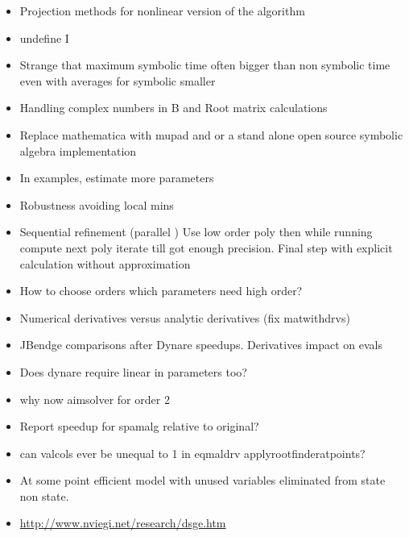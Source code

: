\documentclass[12pt]{article}
\begin{document}
\begin{itemize}
\item Projection methods for nonlinear version of the algorithm
\item undefine I
\item Strange that maximum symbolic time often bigger than non symbolic time even with averages for symbolic smaller
\item Handling complex numbers in B and Root matrix calculations
\item Replace mathematica with mupad and or a stand alone open source symbolic algebra implementation
\item In examples, estimate more parameters
\item Robustness avoiding local mins
\item Sequential refinement (parallel )  Use low order poly then while running compute next poly iterate till got enough precision. Final step with explicit calculation without approximation
\item How to choose orders which parameters need high order?
\item Numerical derivatives versus analytic derivatives (fix matwithdrvs)
\item JBendge comparisons after Dynare speedups. Derivatives impact on evals
\item Does dynare require linear in parameters too?
\item why now aimsolver for order 2
\item Report speedup for spamalg relative to original?
\item can valcols ever be unequal to 1 in eqmaldrv applyrootfinderatpoints?
\item At some point efficient model with unused variables eliminated from state non state.
\item \href{Nicola Viegi}{http://www.nviegi.net/research/dsge.htm}
\end{itemize}





\newpage
\appendix
\end{document}
